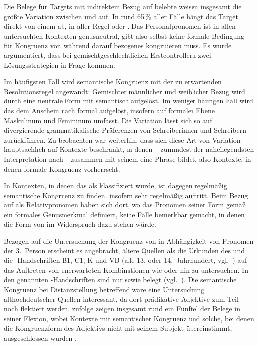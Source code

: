 Die Belege für Targets mit indirektem Bezug auf belebte
 weisen insgesamt die größte Variation zwischen
 und  auf. In rund 65\,\% aller Fälle hängt das Target
direkt von einem  ab, in aller Regel  oder
. Das Personalpronomen ist in allen untersuchten Kontexten
genusneutral, gibt also selbst keine formale Bedingung für
Kongruenz vor, während darauf bezogenes  kongruieren muss. Es wurde
argumentiert, dass bei gemischtgeschlechtlichen
Erstcontrollern zwei Lösungsstrategien in Frage kommen.

Im häufigsten Fall wird semantische Kongruenz mit der
zu erwartenden Resolutionsregel angewandt: Gemischter männlicher und weiblicher
Bezug wird durch eine neutrale Form mit \mbox{} semantisch aufgelöst.
Im weniger häufigen Fall wird das  dem Anschein nach formal
aufgelöst, insofern  auf formaler Ebene Maskulinum und Femininum
umfasst. Die Variation lässt sich so auf divergierende grammatikalische
Präferenzen von Schreiberinnen und Schreibern zurück\-führen. Zu beobachten war
weiterhin, dass sich diese Art von Variation hauptsächlich auf Kontexte
beschränkt, in denen  -- zumindest der naheliegendsten
Interpretation nach -- zusammen mit seinem  eine Phrase
bildet, also Kontexte, in denen formale
Kongruenz vorherrscht.

In Kontexten, in denen das  als 
klassifiziert wurde, ist dagegen regelmäßig semantische
Kongruenz zu finden, insofern sehr regelmäßig
 auftritt. Beim Bezug auf  als
Relativpronomen haben sich dort, wo das Pronomen seiner
Form gemäß ein formales Genusmerkmal definiert, keine Fälle
bemerkbar gemacht, in denen die Form von  im Widerspruch dazu
stehen würde.

Bezogen auf die Untersuchung der Kongruenz von  in Abhängigkeit von
Pro\-nomen der 3.~Person erscheint es angebracht, ältere Quellen
als die Urkunden des \CAO{} und die \KC{}-Handschriften B1, C1, K und VB (alle
13. oder 14.~Jahrhundert, vgl.~) auf das Auftreten von
unerwarteten Kombinationen wie  oder  hin zu
untersuchen. In den genannten \KC{}-Handschriften sind nur 
sowie  belegt (vgl.~). Die
semantische Kongruenz bei Distanz\-stellung
betreffend wäre eine Untersuchung althochdeutscher Quellen
interessant, da dort prädikative
Adjektive zum Teil noch flektiert
werden. \citet[310--311]{fleischer2007} zufolge
zeigen insgesamt rund ein Fünftel der Belege in seiner 
Flexion, wobei Kontexte mit semantischer Kongruenz und solche, bei denen die
Kongruenzform des Adjektivs nicht mit seinem Subjekt übereinstimmt,
ausgeschlossen wurden \autocite[304]{fleischer2007}.

